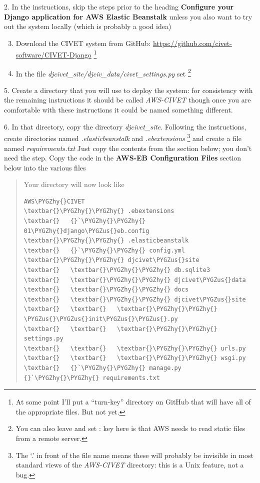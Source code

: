 \documentclass[letterpaper,10pt,english]{sphinxmanual}
\def\PYGZus{\char`\_}
\def\PYGZhy{\char`\-}
\begin{document}
2. In the instructions, skip the steps prior to the
heading \textbf{Configure your Django application for AWS Elastic Beanstalk} unless you also want to try out the system
locally (which is probably a good idea)
\begin{enumerate}
\setcounter{enumi}{2}
\item {} 
Download the CIVET system from GitHub: \href{https://github.com/civet-software/CIVET-Django}{https://github.com/civet-software/CIVET-Django} \footnote{
At some point I'll put a “turn-key” directory on GitHub that will have all of the appropriate files. But not yet.
}

\item {} 
In the file \emph{djcivet\_site/djciv\_data/civet\_settings.py} set  \footnote{
You can also leave  and set :
key here is that AWS needs to read static files from a remote server.
}

\end{enumerate}

5. Create a directory that you will use to deploy the system: for consistency with the remaining instructions it should be
called \emph{AWS-CIVET} though once you are comfortable with these instructions it could be named something different.

6. In that directory, copy the directory \emph{djcivet\_site}. Following the instructions, create directories named \emph{.elasticbeanstalk}
and \emph{.ebextensions} \footnote{
The ‘.’ in front of the file name means these will probably be invisible in most standard views of the \emph{AWS-CIVET}
directory: this is a Unix feature, not a bug.
}
and create a file named \emph{requirements.txt} Just copy the contents from the section below; you don't need the 
step. Copy the code in the \textbf{AWS-EB Configuration Files} section below into the various files
\begin{quote}

Your directory will now look like

\begin{Verbatim}[commandchars=\\\{\}]
AWS\PYGZhy{}CIVET
\textbar{}\PYGZhy{}\PYGZhy{} .ebextensions
\textbar{}   {}`\PYGZhy{}\PYGZhy{} 01\PYGZhy{}django\PYGZus{}eb.config
\textbar{}\PYGZhy{}\PYGZhy{} .elasticbeanstalk
\textbar{}   {}`\PYGZhy{}\PYGZhy{} config.yml
\textbar{}\PYGZhy{}\PYGZhy{} djcivet\PYGZus{}site
\textbar{}   \textbar{}\PYGZhy{}\PYGZhy{} db.sqlite3
\textbar{}   \textbar{}\PYGZhy{}\PYGZhy{} djcivet\PYGZus{}data
\textbar{}   \textbar{}\PYGZhy{}\PYGZhy{} docs
\textbar{}   \textbar{}\PYGZhy{}\PYGZhy{} djcivet\PYGZus{}site
\textbar{}   \textbar{}   \textbar{}\PYGZhy{}\PYGZhy{} \PYGZus{}\PYGZus{}init\PYGZus{}\PYGZus{}.py
\textbar{}   \textbar{}   \textbar{}\PYGZhy{}\PYGZhy{} settings.py
\textbar{}   \textbar{}   \textbar{}\PYGZhy{}\PYGZhy{} urls.py
\textbar{}   \textbar{}   \textbar{}\PYGZhy{}\PYGZhy{} wsgi.py
\textbar{}   {}`\PYGZhy{}\PYGZhy{} manage.py
{}`\PYGZhy{}\PYGZhy{} requirements.txt
\end{Verbatim}
\end{quote}
\end{document}

